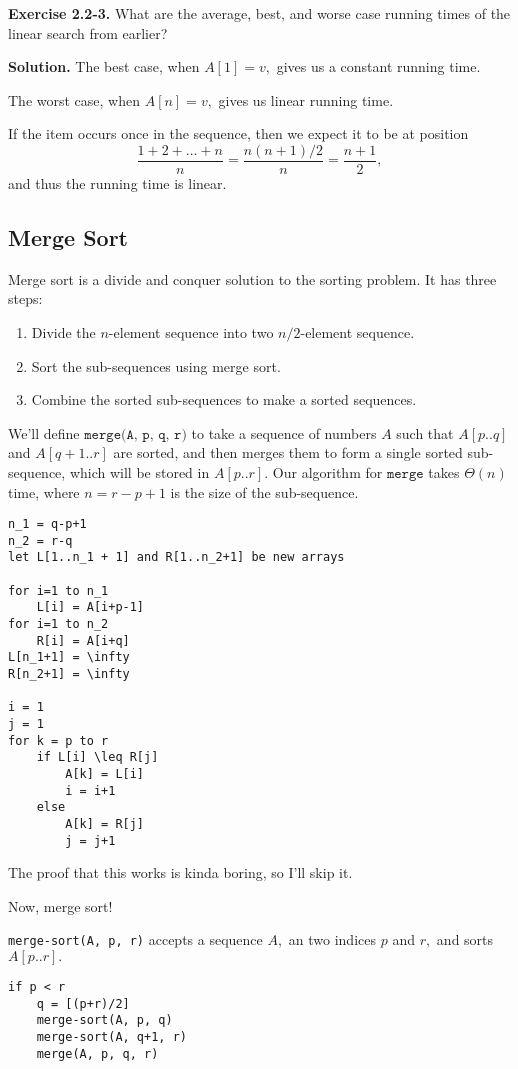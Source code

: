\documentclass{article}
\newcommand{\exec}[2]
{\textbf{Exercise #1.} #2

\textbf{Solution.}}
\begin{document}
\exec{2.2-3}{What are the average, best, and worse case running times of the linear search from earlier?}
The best case, when $A[1] = v,$ gives us a constant running time.

The worst case, when $A[n] = v,$ gives us linear running time.

If the item occurs once in the sequence, then we expect it to be at position $$\frac{1+2+\dots+n}{n} = \frac{n(n+1)/2}{n} = \frac{n+1}{2},$$
and thus the running time is linear.

\subsection{Merge Sort}

Merge sort is a divide and conquer solution to the sorting problem. It has three steps:
\begin{enumerate}
	\item Divide the $n$-element sequence into two $n/2$-element sequence.
	\item Sort the sub-sequences using merge sort.
	\item Combine the sorted sub-sequences to make a sorted sequences.
\end{enumerate}

We'll define $\texttt{merge(A, p, q, r)}$ to take a sequence of numbers $A$ such that $A[p..q]$ and $A[q+1..r]$ are sorted, and then merges them to form a single sorted sub-sequence, which will be stored in $A[p..r].$ Our algorithm for $\texttt{merge}$ takes $\Theta(n)$ time, where $n = r-p+1$ is the size of the sub-sequence.

\begin{lstlisting}
n_1 = q-p+1
n_2 = r-q
let L[1..n_1 + 1] and R[1..n_2+1] be new arrays

for i=1 to n_1
	L[i] = A[i+p-1]
for i=1 to n_2
	R[i] = A[i+q]
L[n_1+1] = \infty
R[n_2+1] = \infty

i = 1
j = 1
for k = p to r
	if L[i] \leq R[j]
		A[k] = L[i]
		i = i+1
	else
		A[k] = R[j]
		j = j+1
\end{lstlisting}

The proof that this works is kinda boring, so I'll skip it.  

Now, merge sort!

\texttt{merge-sort(A, p, r)} accepts a sequence $A,$ an two indices $p$ and $r,$ and sorts $A[p..r].$

\begin{lstlisting}
if p < r
	q = [(p+r)/2]
	merge-sort(A, p, q)
	merge-sort(A, q+1, r)
	merge(A, p, q, r)
\end{lstlisting}
\end{document}

